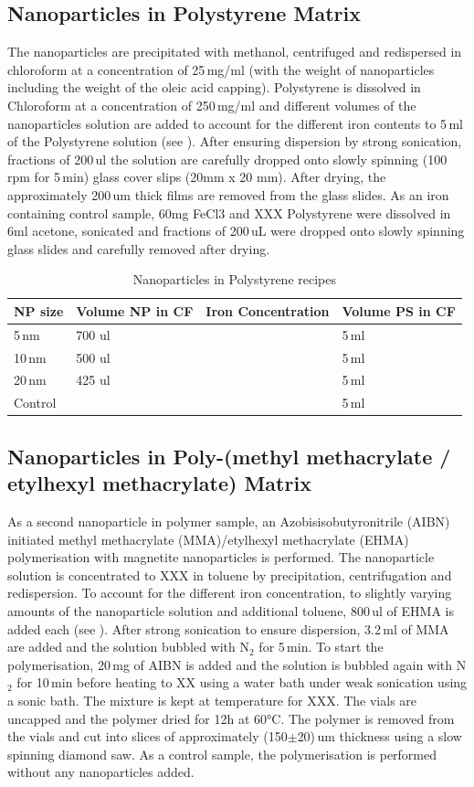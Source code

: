 \subsection{Nanoparticles in Polystyrene Matrix} 
The nanoparticles are precipitated with methanol, centrifuged and redispersed in chloroform at a concentration of 25\,mg/ml (with the weight of nanoparticles including the weight of the oleic acid capping). Polystyrene is dissolved in Chloroform at a concentration of 250\,mg/ml and different volumes of the nanoparticles solution are added to account for the different iron contents to 5\,ml of the Polystyrene solution (see ). After ensuring dispersion by strong sonication, fractions of 200\,ul the solution are carefully dropped onto slowly spinning (100 rpm for 5\,min) glass cover slips (20mm x 20 mm). After drying, the approximately 200\,um thick films are removed from the glass slides.
As an iron containing control sample, 60mg FeCl3 and XXX Polystyrene were dissolved in 6ml acetone, sonicated and  fractions of 200\,uL were dropped onto slowly spinning glass slides  and carefully removed after drying.
\begin{table}[tp]
	\centering
	\caption{Nanoparticles in Polystyrene recipes}
	\label{tab:samplePS}
	\begin{tabular}{llll}
		\hline
	NP size&   Volume NP in CF &  Iron Concentration &Volume PS in CF    \\
		\hline
	  5\,nm&700 ul & & 5\,ml  \\  
	   10\,nm&  500 ul& &5\,ml  \\    
	   20\,nm &  425 ul& &5\,ml  \\  
	   	Control   &  & &5\,ml  \\  
		\hline
	\end{tabular}
\end{table}

\subsection{Nanoparticles in Poly-(methyl methacrylate / etylhexyl methacrylate)  Matrix}
As a second nanoparticle in polymer sample, an Azobisisobutyronitrile (AIBN) initiated methyl methacrylate (MMA)/etylhexyl methacrylate (EHMA) polymerisation with magnetite nanoparticles is performed. 
The nanoparticle solution is concentrated to XXX in toluene by precipitation, centrifugation and redispersion. To account for the different iron concentration, to slightly varying amounts of the nanoparticle solution and additional toluene, 800\,ul of EHMA is added each (see ). After strong sonication to ensure dispersion, 3.2\,ml of MMA are added and the solution  bubbled with N$_2$ for 5\,min. To start the polymerisation, 20\,mg of AIBN is added and the solution is bubbled again with N$_2$  for 10\,min before heating to XX using a water bath under weak sonication using a sonic bath. The mixture is kept at temperature for XXX.
The vials are uncapped and the polymer dried for 12h at 60°C. The polymer is removed from the vials and cut into slices of approximately (150$\pm$20)\,um thickness using a slow spinning diamond saw.
As a control sample, the polymerisation is performed without any nanoparticles added.

